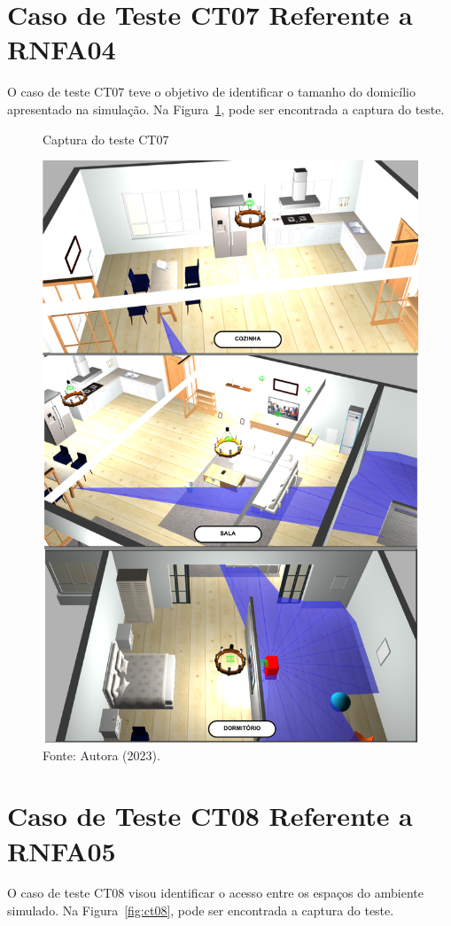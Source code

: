 \section{Caso de Teste CT07 Referente a RNFA04}
O caso de teste CT07 teve o objetivo de identificar o tamanho do domicílio apresentado na simulação. Na Figura~\ref{fig:ct07}, pode ser encontrada a captura do teste.

\begin{figure}[H]
    \centering
    \caption{Captura do teste CT07}
    \includegraphics[scale=0.45]{ct07.png}
    \caption*{Fonte: Autora (2023).}
    \label{fig:ct07}
\end{figure}

\section{Caso de Teste CT08 Referente a RNFA05}
O caso de teste CT08 visou identificar o acesso entre os espaços do ambiente simulado. Na Figura~\ref{fig:ct08}, pode ser encontrada a captura do teste.

